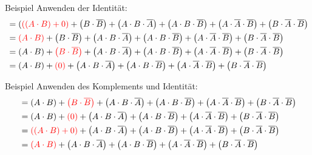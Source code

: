 \documentclass[12pt%
,aspectratio=169%
]{beamer}
\begin{document}
\begin{frame}{Beispiel}
Anwenden der Identität:
\begin{align*}
&=(\textcolor{red}{\left(\left(A \cdot B\right) + 0\right)} + \left(B \cdot \overline{B}\right) + \left(A \cdot B \cdot \overline{A}\right) + \left(A \cdot B \cdot \overline{B}\right) + \left(A \cdot \overline{A} \cdot \overline{B}\right) + \left(B \cdot \overline{A} \cdot \overline{B}\right) \\
&= \textcolor{red}{\left(A \cdot B\right)} + \left(B \cdot \overline{B}\right) + \left(A \cdot B \cdot \overline{A}\right) + \left(A \cdot B \cdot \overline{B}\right) + \left(A \cdot \overline{A} \cdot \overline{B}\right) + \left(B \cdot \overline{A} \cdot \overline{B}\right)\\
&= \left(A \cdot B\right) + \textcolor{red}{\left(B \cdot \overline{B}\right)} + \left(A \cdot B \cdot \overline{A}\right) + \left(A \cdot B \cdot \overline{B}\right) + \left(A \cdot \overline{A} \cdot \overline{B}\right) + \left(B \cdot \overline{A} \cdot \overline{B}\right) \\
&= \left(A \cdot B\right) + \textcolor{red}{\left(0\right)} + \left(A \cdot B \cdot \overline{A}\right) + \left(A \cdot B \cdot \overline{B}\right) + \left(A \cdot \overline{A} \cdot \overline{B}\right) + \left(B \cdot \overline{A} \cdot \overline{B}\right)
\end{align*}
\end{frame}

\begin{frame}{Beispiel}
Anwenden des Komplements und Identität:
\begin{align*}
&= \left(A \cdot B\right) + \textcolor{red}{\left(B \cdot \overline{B}\right)} + \left(A \cdot B \cdot \overline{A}\right) + \left(A \cdot B \cdot \overline{B}\right) + \left(A \cdot \overline{A} \cdot \overline{B}\right) + \left(B \cdot \overline{A} \cdot \overline{B}\right)\\
&= \left(A \cdot B\right) + \textcolor{red}{\left(0\right)} + \left(A \cdot B \cdot \overline{A}\right) + \left(A \cdot B \cdot \overline{B}\right) + \left(A \cdot \overline{A} \cdot \overline{B}\right) + \left(B \cdot \overline{A} \cdot \overline{B}\right)\\
&= \textcolor{red}{\left(\left(A \cdot B\right) + 0\right)} + \left(A \cdot B \cdot \overline{A}\right) + \left(A \cdot B \cdot \overline{B}\right) + \left(A \cdot \overline{A} \cdot \overline{B}\right) + \left(B \cdot \overline{A} \cdot \overline{B}\right) \\
&= \textcolor{red}{\left(A \cdot B\right)} + \left(A \cdot B \cdot \overline{A}\right) + \left(A \cdot B \cdot \overline{B}\right) + \left(A \cdot \overline{A} \cdot \overline{B}\right) + \left(B \cdot \overline{A} \cdot \overline{B}\right)
\end{align*}
\end{frame}
\end{document}
